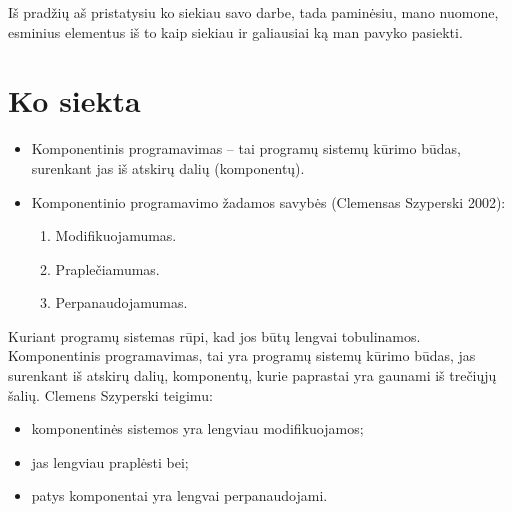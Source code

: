 \begin{handout}
  Iš pradžių aš pristatysiu ko siekiau savo darbe, tada paminėsiu,
  mano nuomone, esminius elementus iš to kaip siekiau ir galiausiai
  ką man pavyko pasiekti.
\end{handout}

\section{Ko siekta}

\begin{frame}
  \begin{itemize}
    \item Komponentinis programavimas – tai programų sistemų kūrimo
      būdas, surenkant jas iš atskirų dalių (komponentų).
    \item Komponentinio programavimo žadamos savybės (Clemensas
      Szyperski 2002):
      \begin{enumerate}
        \item Modifikuojamumas.
        \item Praplečiamumas.
        \item Perpanaudojamumas.
      \end{enumerate}
  \end{itemize}
  \begin{handout}
    Kuriant programų sistemas rūpi, kad jos būtų lengvai tobulinamos.
    Komponentinis programavimas, tai yra programų sistemų kūrimo
    būdas, jas surenkant iš atskirų dalių, komponentų, kurie
    paprastai yra gaunami iš trečiųjų šalių. Clemens Szyperski
    teigimu:
    \begin{itemize}
      \item komponentinės sistemos yra lengviau modifikuojamos;
      \item jas lengviau praplėsti bei;
      \item patys komponentai yra lengvai perpanaudojami.
    \end{itemize}
  \end{handout}
\end{frame}

